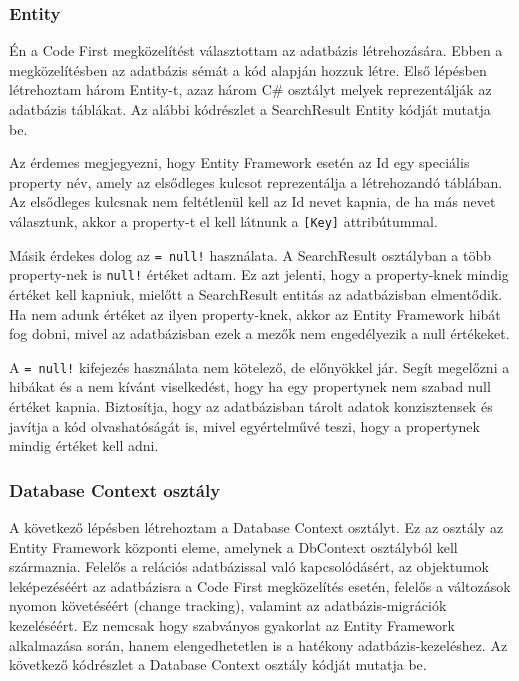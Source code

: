 \documentclass[
]{thesis-ekf}
\theoremstyle{definition}
\theoremstyle{remark}
\begin{document}
\subsubsection{Entity}
Én a Code First megközelítést választottam az adatbázis létrehozására. Ebben a megközelítésben az adatbázis sémát a kód alapján hozzuk létre. Első lépésben létrehoztam három Entity-t, azaz három C\# osztályt melyek reprezentálják az adatbázis táblákat. Az alábbi kódrészlet a SearchResult Entity kódját mutatja be.

	
Az érdemes megjegyezni, hogy Entity Framework esetén az Id egy speciális property név, amely az elsődleges kulcsot reprezentálja a létrehozandó táblában. Az elsődleges kulcsnak nem feltétlenül kell az Id nevet kapnia, de ha más nevet választunk, akkor a property-t el kell látnunk a \texttt{[Key]} attribútummal.

Másik érdekes dolog az \texttt{= null!} használata. A SearchResult osztályban a több property-nek is \texttt{null!} értéket adtam. Ez azt jelenti, hogy a property-knek mindig értéket kell kapniuk, mielőtt a SearchResult entitás az adatbázisban elmentődik. Ha nem adunk értéket az ilyen property-knek, akkor az Entity Framework hibát fog dobni, mivel az adatbázisban ezek a mezők nem engedélyezik a null értékeket.

A \texttt{= null!} kifejezés használata nem kötelező, de előnyökkel jár. Segít megelőzni a hibákat és a nem kívánt viselkedést, hogy ha egy propertynek nem szabad null értéket kapnia. Biztosítja, hogy az adatbázisban tárolt adatok konzisztensek és javítja a kód olvashatóságát is, mivel egyértelművé teszi, hogy a propertynek mindig értéket kell adni.

\subsubsection{Database Context osztály}
A következő lépésben létrehoztam a Database Context osztályt. Ez az osztály az Entity Framework központi eleme, amelynek a DbContext osztályból kell származnia. Felelős a relációs adatbázissal való kapcsolódásért, az objektumok leképezéséért az adatbázisra a Code First megközelítés esetén, felelős a változások nyomon követéséért (change tracking), valamint az adatbázis-migrációk kezeléséért. Ez nemcsak hogy szabványos gyakorlat az Entity Framework alkalmazása során, hanem elengedhetetlen is a hatékony adatbázis-kezeléshez. Az következő kódrészlet a  Database Context osztály kódját mutatja be.
\end{document}
